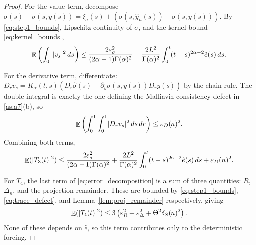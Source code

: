 \documentclass[11pt, a4paper]{article}
\theoremstyle{theoremstyle}
\theoremstyle{definitionstyle}
\newcommand{\dd}{\mathop{}\!d}
\DeclareMathOperator{\EE}{\mathbb E}
\DeclarePairedDelimiter{\abs}{\lvert}{\rvert}
\begin{document}
\begin{proof}
    For the value term, decompose $\hat\sigma(s) - \sigma(s, y(s)) = \xi_\sigma(s) + (\sigma(s, \hat y_n(s)) - \sigma(s, y(s)))$. By \eqref{eq:step1_bounds}, Lipschitz continuity of $\sigma$, and the kernel bound \eqref{eq:kernel_bounds},
    \begin{equation}
        \EE \left ( \int_0^1 \abs{v_s}^2\dd{s} \right ) \leq \frac{2\varepsilon_\sigma^2}{(2\alpha - 1)\Gamma(\alpha)^2} + \frac{2L^2}{\Gamma(\alpha)^2}\int_0^t (t - s)^{2\alpha - 2}\hat e(s)\dd{s}.
    \end{equation}

    For the derivative term, differentiate: $D_rv_s = K_\alpha(t, s)(D_r\hat\sigma(s) - \partial_y\sigma(s, y(s))D_ry(s))$ by the chain rule. The double integral is exactly the one defining the Malliavin consistency defect in \ref{as:a7}(b), so
    \begin{equation}
        \EE \left ( \int_0^1\int_0^1\abs{D_rv_s}^2\dd{s}\dd{r} \right ) \leq \varepsilon_D(n)^2.
    \end{equation}
    Combining both terms,
    \begin{equation}\label{eq:T3_bound}
        \EE (\abs{T_3(t)}^2) \leq \frac{2\varepsilon_\sigma^2}{(2\alpha-1)\Gamma(\alpha)^2} + \frac{2L^2}{\Gamma(\alpha)^2}\int_0^t (t-s)^{2\alpha-2}\hat e(s)\dd{s} + \varepsilon_D(n)^2.
    \end{equation}

    For $T_4$, the last term of \eqref{eq:error_decomposition} is a sum of three quantities: $R$, $\Delta_n$, and the projection remainder. These are bounded by \eqref{eq:step1_bounds}, \eqref{eq:trace_defect}, and Lemma~\ref{lem:proj_remainder} respectively, giving
    \begin{equation}\label{eq:T4_bound}
        \EE (\abs{T_4(t)}^2) \leq 3 \left ( \varepsilon_R^2 + \varepsilon_\Delta^2 + \Theta^2\delta_S(n)^2 \right ).
    \end{equation}
    None of these depends on $\hat e$, so this term contributes only to the deterministic forcing.


\end{proof}
\end{document}
